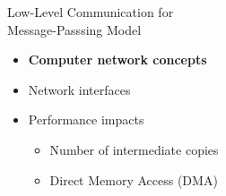 		\begin{frame}[fragile]{Low-Level Communication for\\Message-Passsing Model}
			\begin{itemize}
				\item \textbf{Computer network concepts}
			\end{itemize}

			\begin{itemize}
				\item Network interfaces
			\end{itemize}

			\begin{itemize}
				\item Performance impacts
				\begin{itemize}
					\item Number of intermediate copies
					\item Direct Memory Access (DMA)
				\end{itemize}
			\end{itemize}

		\end{frame}

